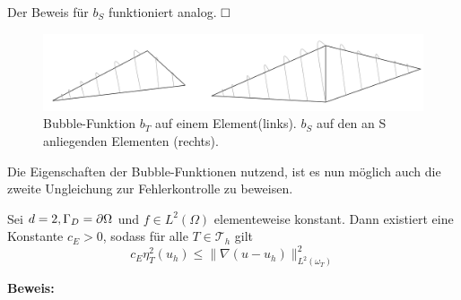 Der Beweis für $b_S$ funktioniert analog.
$\hfill \Box$
\begin{figure}[!htbp]
	\begin{center}
		\includegraphics[width=16cm]{pics/bubble.png}
	\end{center}
	\caption{Bubble-Funktion $b_T$ auf einem Element(links). $b_S$ auf den an S anliegenden Elementen (rechts).}
\end{figure}
\newpage
Die Eigenschaften der Bubble-Funktionen nutzend, ist es nun möglich auch die zweite Ungleichung zur Fehlerkontrolle zu beweisen. 
\begin{theorem}
	Sei $d=2, \Gamma_D = \partial \Omega$ und $f\in L^2(\Omega)$ elementeweise konstant. Dann existiert eine Konstante $c_E > 0$, sodass für alle $T\in\mathscr{T}_h$ gilt
	\[
		c_E \eta_T^2(u_h)\leq \|\nabla (u-u_h)\|^2_{L^2(\omega_T)}
	\] 
\end{theorem}
\textbf{Beweis:}
